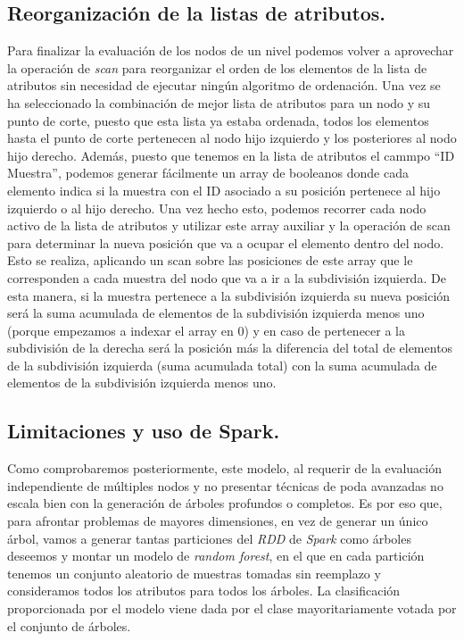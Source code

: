 \subsection{Reorganización de la listas de atributos.}
Para finalizar la evaluación de los nodos de un nivel podemos volver a aprovechar la operación de \textit{scan} para reorganizar el orden de los elementos de la lista de atributos sin necesidad de ejecutar ningún algoritmo de ordenación. Una vez se ha seleccionado la combinación de mejor lista de atributos para un nodo y su punto de corte, puesto que esta lista ya estaba ordenada, todos los elementos hasta el punto de corte pertenecen al nodo hijo izquierdo y los posteriores al nodo hijo derecho. Además, puesto que tenemos en la lista de atributos el cammpo ``ID Muestra'', podemos generar fácilmente un array de booleanos donde cada elemento indica si la muestra con el ID asociado a su posición pertenece al hijo izquierdo o al hijo derecho. Una vez hecho esto, podemos recorrer cada nodo activo de la lista de atributos y utilizar este array auxiliar y la operación de scan para determinar la nueva posición que va a ocupar el elemento dentro del nodo. Esto se realiza, aplicando un scan sobre las posiciones de este array que le corresponden a cada muestra del nodo que va a ir a la subdivisión izquierda. De esta manera, si la muestra pertenece a la subdivisión izquierda su nueva posición será la suma acumulada de elementos de la subdivisión izquierda menos uno (porque empezamos a indexar el array en 0) y en caso de pertenecer a la subdivisión de la derecha será la posición más la diferencia del total de elementos de la subdivisión izquierda (suma acumulada total) con la suma acumulada de elementos de la subdivisión izquierda menos uno.

\subsection{Limitaciones y uso de Spark.}
Como comprobaremos posteriormente, este modelo, al requerir de la evaluación independiente de múltiples nodos y no presentar técnicas de poda avanzadas no escala bien con la generación de árboles profundos o completos. Es por eso que, para afrontar problemas de mayores dimensiones, en vez de generar un único árbol, vamos a generar tantas particiones del \textit{RDD} de \textit{Spark} como árboles deseemos y montar un modelo de \textit{random forest}, en el que en cada partición tenemos un conjunto aleatorio de muestras tomadas sin reemplazo y consideramos todos los atributos para todos los árboles. La clasificación proporcionada por el modelo viene dada por el clase mayoritariamente votada por el conjunto de árboles.
